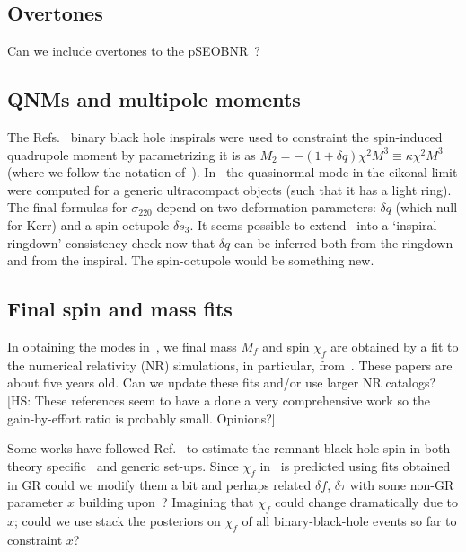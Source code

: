 \documentclass[aps,prd,10pt,preprint,
               notitlepage,onecolumn,superscriptaddress,
               eqsecnum,
               nofootinbib,tightenlines,floatfix]{revtex4-2}
\newcommand{\hs}[1]{{\color{magenta}[HS: #1]}}
\begin{document}
\subsection{Overtones}
%
Can we include overtones to the pSEOBNR~\cite{Brito:2018rfr,Ghosh:2021mrv}?


\subsection{QNMs and multipole moments}
%
The Refs.~\cite{Krishnendu:2017shb,Krishnendu:2019tjp} binary black hole
inspirals were used to constraint the spin-induced quadrupole moment by
parametrizing it is as $M_2 = - (1 + \delta q) \chi^2 M^3 \equiv \kappa \chi^2 M^3$ (where we follow the
notation of~\cite{Glampedakis:2017cgd}).
%
In~\cite{Glampedakis:2017cgd} the quasinormal mode in the eikonal limit were computed
for a generic ultracompact objects (such that it has a light ring).
%
The final formulas for $\sigma_{220}$ depend on two deformation parameters:
$\delta q$ (which null for Kerr) and a spin-octupole $\delta s_{3}$.
%
It seems possible to extend~\cite{Krishnendu:2017shb,Krishnendu:2019tjp}
into a `inspiral-ringdown' consistency check now that $\delta q$ can be inferred
both from the ringdown and from the inspiral. The spin-octupole would be something new.


\subsection{Final spin and mass fits}
%
In obtaining the modes in~\cite{Ghosh:2021mrv}, we final mass $M_f$ and spin
$\chi_f$ are obtained by a fit to the numerical relativity (NR) simulations, in
particular, from~\cite{Taracchini:2013rva,Hofmann:2016yih}.
%
These papers are about five years old. Can we update these fits and/or use
larger NR catalogs?
%
\hs{These references seem to have a done a very comprehensive work so the
gain-by-effort ratio is probably small. Opinions?}

Some works have followed Ref.~\cite{Buonanno:2007sv} to estimate the remnant black hole spin
in both theory specific~\cite{Jai-akson:2017ldo} and generic set-ups.
%
Since $\chi_f$ in~\cite{Ghosh:2021mrv} is predicted using fits obtained in GR
could we modify them a bit and perhaps related $\delta f$, $\delta \tau$ with
some non-GR parameter $x$ building upon~\cite{Buonanno:2007sv}?
%
Imagining that $\chi_f$ could change dramatically due to $x$;
could we use stack the posteriors on $\chi_f$ of all binary-black-hole events so far
to constraint $x$?
\end{document}
